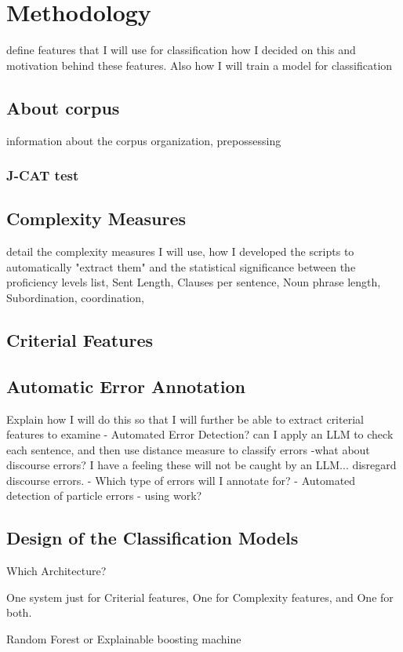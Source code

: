 \chapter{Methodology}
define  features that I will use for classification how I decided on this and motivation behind these features.
Also how I will train a model for classification 


\section{About corpus}
information about the corpus organization, prepossessing

\subsection{J-CAT test}

\section{Complexity Measures}
detail the complexity measures I will use, how I developed the scripts to automatically "extract them" and the statistical significance between the proficiency levels
list, Sent Length, Clauses per sentence, Noun phrase length,  Subordination, coordination, 

\section{Criterial Features}

\section{Automatic Error Annotation}

Explain how I will do this so that I will further be able to extract criterial features to examine
 - Automated Error Detection?
    can I apply an LLM to check each sentence, and then use distance measure to classify errors 
    -what about discourse errors? I have a feeling these will not be caught by an LLM...
        disregard discourse errors.
 - Which type of errors will I annotate for? 
        - Automated detection of particle errors - using work?


\section{Design of the Classification Models}
Which Architecture?

One system just for Criterial features, One for Complexity features, and One for both. 

Random Forest or Explainable boosting machine
